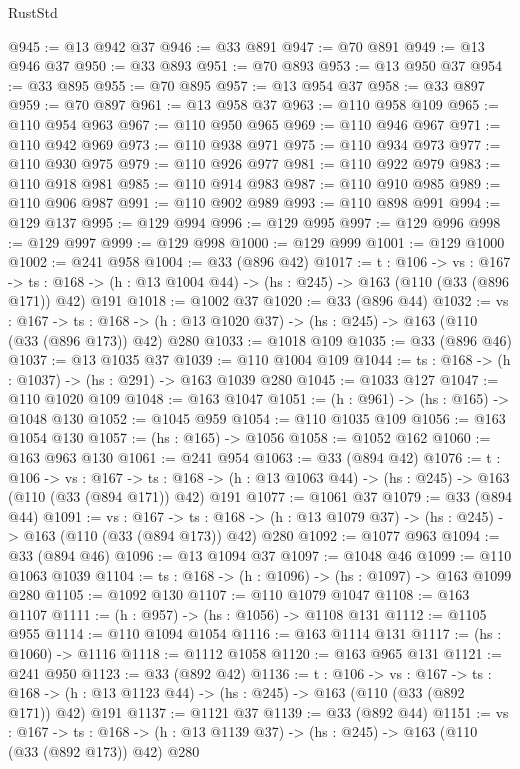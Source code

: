\begin{lexlean}{RustStd}
\begin{coremodule}
@945 := @13 @942 @37
@946 := @33 @891
@947 := @70 @891
@949 := @13 @946 @37
@950 := @33 @893
@951 := @70 @893
@953 := @13 @950 @37
@954 := @33 @895
@955 := @70 @895
@957 := @13 @954 @37
@958 := @33 @897
@959 := @70 @897
@961 := @13 @958 @37
@963 := @110 @958 @109
@965 := @110 @954 @963
@967 := @110 @950 @965
@969 := @110 @946 @967
@971 := @110 @942 @969
@973 := @110 @938 @971
@975 := @110 @934 @973
@977 := @110 @930 @975
@979 := @110 @926 @977
@981 := @110 @922 @979
@983 := @110 @918 @981
@985 := @110 @914 @983
@987 := @110 @910 @985
@989 := @110 @906 @987
@991 := @110 @902 @989
@993 := @110 @898 @991
@994 := @129 @137
@995 := @129 @994
@996 := @129 @995
@997 := @129 @996
@998 := @129 @997
@999 := @129 @998
@1000 := @129 @999
@1001 := @129 @1000
@1002 := @241 @958
@1004 := @33 (@896 @42)
@1017 := {t : @106} ->
  {vs : @167} ->
  {ts : @168} -> (h : @13 @1004 @44) -> (hs : @245) -> @163 (@110 (@33 (@896 @171)) @42) @191
@1018 := @1002 @37
@1020 := @33 (@896 @44)
@1032 := {vs : @167} ->
  {ts : @168} -> (h : @13 @1020 @37) -> (hs : @245) -> @163 (@110 (@33 (@896 @173)) @42) @280
@1033 := @1018 @109
@1035 := @33 (@896 @46)
@1037 := @13 @1035 @37
@1039 := @110 @1004 @109
@1044 := {ts : @168} -> (h : @1037) -> (hs : @291) -> @163 @1039 @280
@1045 := @1033 @127
@1047 := @110 @1020 @109
@1048 := @163 @1047
@1051 := (h : @961) -> (hs : @165) -> @1048 @130
@1052 := @1045 @959
@1054 := @110 @1035 @109
@1056 := @163 @1054 @130
@1057 := (hs : @165) -> @1056
@1058 := @1052 @162
@1060 := @163 @963 @130
@1061 := @241 @954
@1063 := @33 (@894 @42)
@1076 := {t : @106} ->
  {vs : @167} ->
  {ts : @168} -> (h : @13 @1063 @44) -> (hs : @245) -> @163 (@110 (@33 (@894 @171)) @42) @191
@1077 := @1061 @37
@1079 := @33 (@894 @44)
@1091 := {vs : @167} ->
  {ts : @168} -> (h : @13 @1079 @37) -> (hs : @245) -> @163 (@110 (@33 (@894 @173)) @42) @280
@1092 := @1077 @963
@1094 := @33 (@894 @46)
@1096 := @13 @1094 @37
@1097 := @1048 @46
@1099 := @110 @1063 @1039
@1104 := {ts : @168} -> (h : @1096) -> (hs : @1097) -> @163 @1099 @280
@1105 := @1092 @130
@1107 := @110 @1079 @1047
@1108 := @163 @1107
@1111 := (h : @957) -> (hs : @1056) -> @1108 @131
@1112 := @1105 @955
@1114 := @110 @1094 @1054
@1116 := @163 @1114 @131
@1117 := (hs : @1060) -> @1116
@1118 := @1112 @1058
@1120 := @163 @965 @131
@1121 := @241 @950
@1123 := @33 (@892 @42)
@1136 := {t : @106} ->
  {vs : @167} ->
  {ts : @168} -> (h : @13 @1123 @44) -> (hs : @245) -> @163 (@110 (@33 (@892 @171)) @42) @191
@1137 := @1121 @37
@1139 := @33 (@892 @44)
@1151 := {vs : @167} ->
  {ts : @168} -> (h : @13 @1139 @37) -> (hs : @245) -> @163 (@110 (@33 (@892 @173)) @42) @280

\end{coremodule}
\end{lexlean}
